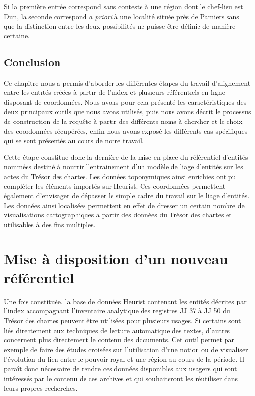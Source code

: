\documentclass[a4paper,12pt,twoside]{book}
\begin{document}
	\noindent Si la première entrée correspond sans conteste à une région dont le chef-lieu est Dun, la seconde correspond \textit{a priori} à une localité située près de Pamiers sans que la distinction entre les deux possibilités ne puisse être définie de manière certaine.
	
	\section*{Conclusion}
	
	Ce chapitre nous a permis d'aborder les différentes étapes du travail d'alignement entre les entités créées à partir de l'index et plusieurs référentiels en ligne disposant de coordonnées. Nous avons pour cela présenté les caractéristiques des deux principaux outils que nous avons utilisés, puis nous avons décrit le processus de construction de la requête à partir des différents noms à chercher et le choix des coordonnées récupérées, enfin nous avons exposé les différents cas spécifiques qui se sont présentés au cours de notre travail.
	
	Cette étape constitue donc la dernière de la mise en place du référentiel d'entités nommées destiné à nourrir l'entrainement d'un modèle de liage d'entités sur les actes du Trésor des chartes. Les données toponymiques ainsi enrichies ont pu compléter les éléments importés sur Heurist. Ces coordonnées permettent également d'envisager de dépasser le simple cadre du travail sur le liage d'entités. Les données ainsi localisées permettent en effet de dresser un certain nombre de visualisations cartographiques à partir des données du Trésor des chartes et utilisables à des fins multiples.
	
		
	\chapter{Mise à disposition d'un nouveau référentiel}
	
	Une fois constituée, la base de données Heurist contenant les entités décrites par l'index accompagnant l'inventaire analytique des registres JJ 37 à JJ 50 du Trésor des chartes peuvent être utilisées pour plusieurs usages. Si certains sont liés directement aux techniques de lecture automatique des textes, d'autres concernent plus directement le contenu des documents. Cet outil permet par exemple de faire des études croisées sur l'utilisation d'une notion ou de visualiser l'évolution du lien entre le pouvoir royal et une région au cours de la période. Il paraît donc nécessaire de rendre ces données disponibles aux usagers qui sont intéressés par le contenu de ces archives et qui souhaiteront les réutiliser dans leurs propres recherches.
	
\end{document}
